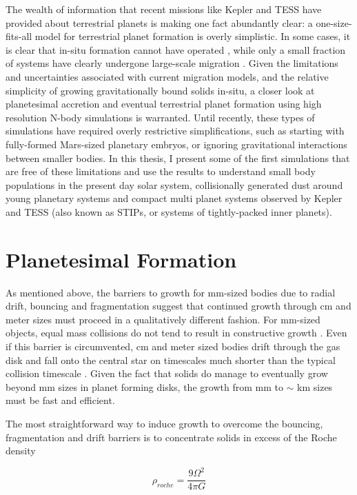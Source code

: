 The wealth of information that recent missions like Kepler and TESS have provided about terrestrial planets is making one fact abundantly clear: a one-size-fits-all model for terrestrial planet formation is overly simplistic. In some cases, it is clear that in-situ formation cannot have operated \cite{raymond14}, while only a small fraction of systems have clearly undergone large-scale migration \cite{he22}. Given the limitations and uncertainties associated with current migration models, and the relative simplicity of growing gravitationally bound solids in-situ, a closer look at planetesimal accretion and eventual terrestrial planet formation using high resolution N-body simulations is warranted. Until recently, these types of simulations have required overly restrictive simplifications, such as starting with fully-formed Mars-sized planetary embryos, or ignoring gravitational interactions between smaller bodies. In this thesis, I present some of the first simulations that are free of these limitations and use the results to understand small body populations in the present day solar system, collisionally generated dust around young planetary systems and compact multi planet systems observed by Kepler and TESS (also known as STIPs, or systems of tightly-packed inner planets).

\section{Planetesimal Formation}

As mentioned above, the barriers to growth for mm-sized bodies due to radial drift, bouncing and fragmentation suggest that continued growth through cm and meter sizes must proceed in a qualitatively different fashion. For mm-sized objects, equal mass collisions do not tend to result in constructive growth \cite{windmark12}. Even if this barrier is circumvented, cm and meter sized bodies drift through the gas disk and fall onto the central star on timescales much shorter than the typical collision timescale \cite{weidenschilling77}. Given the fact that solids do manage to eventually grow beyond mm sizes in planet forming disks, the growth from mm to $\sim$ km sizes must be fast and efficient.

The most straightforward way to induce growth to overcome the bouncing, fragmentation and drift barriers is to concentrate solids in excess of the Roche density 

\begin{equation}
\rho_{roche} = \frac{9 \Omega^{2}}{4 \pi G}
\end{equation}

